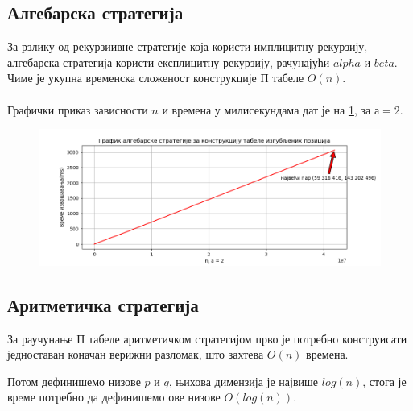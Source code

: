 \documentclass[a4paper]{article}
\begin{document}
\subsection{Алгебарска стратегија}

За рзлику од рекурзиивне стратегије која користи имплицитну рекурзију, алгебарска стратегија користи експлицитну рекурзију, рачунајући $ alpha $ и $ beta $. Чиме је укупна временска сложеност конструкције П табеле $ O(n) $.\\



\leavevmode\\
Графички приказ зависности $ n $ и времена у милисекундама дат је на \ref{fig:algebraic}, за $ а = 2 $.

\begin{figure}[H]
	\label{fig:algebraic}
	\centering
	\includegraphics[width=\textwidth]{algebraic.png}
\end{figure}

\subsection{Аритметичка стратегија}

За раучунање П табеле аритметичком стратегијом прво је потребно конструисати једноставан коначан верижни разломак, што захтева $ O(n) $ времена. 

Потом дефинишемо низове $ p $ и $ q $, њихова димензија је највише $ log(n) $, стога је врeме потребно да дефинишемо ове низове $ O(log(n)) $.
\end{document}
